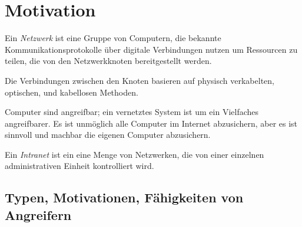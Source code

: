 \section{Motivation}%
\label{sec:motivation}

\begin{definition}[Netzwerk]
  Ein \emph{Netzwerk} ist eine Gruppe von Computern, die bekannte Kommunikationsprotokolle
  über digitale Verbindungen nutzen um Ressourcen zu teilen, die von den Netzwerkknoten
  bereitgestellt werden.

  Die Verbindungen zwischen den Knoten basieren auf physisch verkabelten, optischen, und
  kabellosen Methoden.
\end{definition}

Computer sind angreifbar; ein vernetztes System ist um ein Vielfaches angreifbarer.
Es ist unmöglich alle Computer im Internet abzusichern, aber es ist sinnvoll und machbar
die eigenen Computer abzusichern.

\begin{definition}[Intranet]
  Ein \emph{Intranet} ist ein eine Menge von Netzwerken, die von einer einzelnen
  administrativen Einheit kontrolliert wird.
\end{definition}

\subsection{Typen, Motivationen, Fähigkeiten von Angreifern}%
\label{sub:typen_motivationen_fahigkeiten_von_angreifern}

